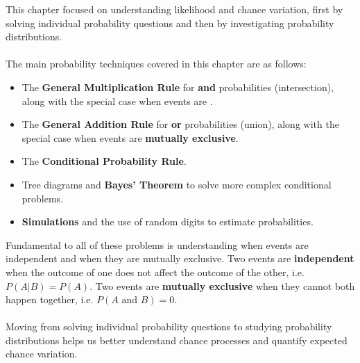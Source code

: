 \noindent This chapter focused on understanding likelihood and chance variation, first by solving individual probability questions and then by investigating probability distributions. 
\\
\\The main probability techniques covered in this chapter are as follows:
\begin{itemize}
\item The \textbf{General Multiplication Rule} for \textbf{and} probabilities (intersection), along with the special case when events are .
\item The \textbf{General Addition Rule} for \textbf{or} probabilities (union), along with the special case when events are \textbf{mutually exclusive}.  
\item The \textbf{Conditional Probability Rule}.
\item Tree diagrams and \textbf{Bayes' Theorem} to solve more complex conditional problems.
\item \textbf{Simulations} and the use of random digits to estimate probabilities.
\end{itemize}
Fundamental to all of these problems is understanding when events are independent and when they are mutually exclusive.  Two events are \textbf{independent} when the outcome of one does not affect the outcome of the other, i.e. $P(A | B) = P(A)$.  Two events are \textbf{mutually exclusive} when they cannot both happen together, i.e. $P(A \text{ and } B) = 0$.
\\ 
\\
Moving from solving individual probability questions to studying probability distributions helps us better understand chance processes and quantify expected chance variation. 
